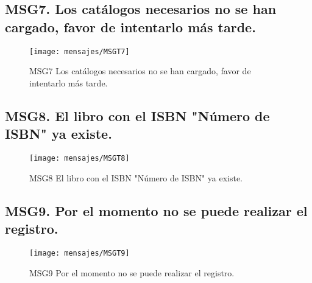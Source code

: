 \subsection{MSG7. Los catálogos necesarios no se han cargado, favor de intentarlo más tarde.}
    \begin{figure}[htbp]
        \begin{center}
            \texttt{[image: mensajes/MSGT7]}
            \caption{MSG7 Los catálogos necesarios no se han cargado, favor de intentarlo más tarde.}
            \label{fig:MSG7}
        \end{center}
    \end{figure}
    
\subsection{MSG8. El libro con el ISBN "Número de ISBN" ya existe.}
    \begin{figure}[htbp]
        \begin{center}
            \texttt{[image: mensajes/MSGT8]}
            \caption{MSG8 El libro con el ISBN "Número de ISBN" ya existe.}
            \label{fig:MSG8}
        \end{center}
    \end{figure}

\subsection{MSG9. Por el momento no se puede realizar el registro.}
    \begin{figure}[htbp]
        \begin{center}
            \texttt{[image: mensajes/MSGT9]}
            \caption{MSG9 Por el momento no se puede realizar el registro.}
            \label{fig:MSG9}
        \end{center}
    \end{figure}

